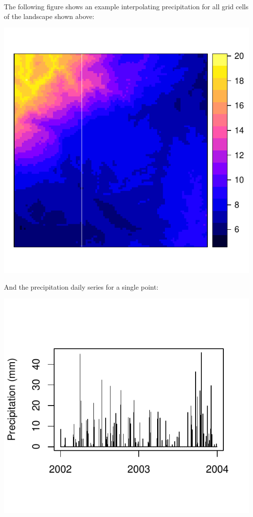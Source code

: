 \documentclass[11pt,a4paper]{article}
\begin{document}
The following figure shows an example interpolating precipitation for all grid cells of the landscape shown above:

\begin{center}
\includegraphics{Meteorology-015}
\end{center}
And the precipitation daily series for a single point:
\begin{center}
\includegraphics{Meteorology-016}
\end{center}
\end{document}
